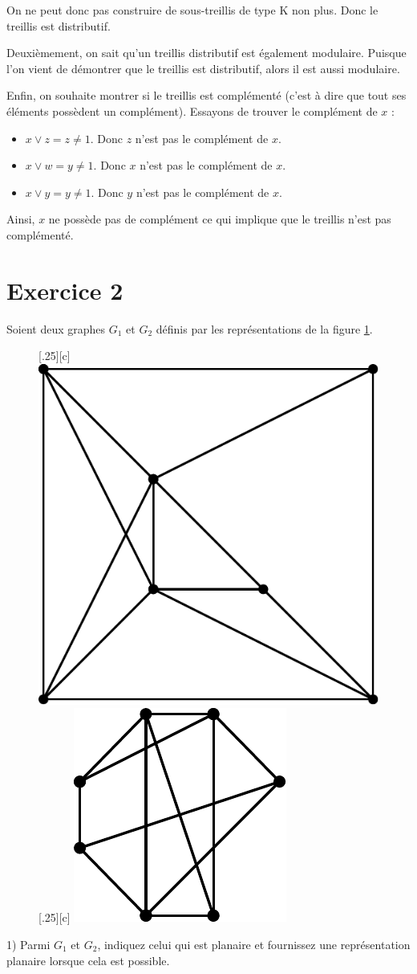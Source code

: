 \documentclass[a4paper,11pt]{article}
\begin{document}
On ne peut donc pas construire de sous-treillis de type K non plus. Donc le treillis est distributif.

Deuxièmement, on sait qu'un treillis distributif est également modulaire. Puisque l'on vient de démontrer que le treillis est distributif, alors il est aussi modulaire.

Enfin, on souhaite montrer si le treillis est complémenté (c'est à dire que tout ses éléments possèdent un complément). Essayons de trouver le complément de $x$ :
\begin{itemize}
	\item $x \vee z = z \neq 1$. Donc $z$ n'est pas le complément de $x$.
	\item $x \vee w = y \neq 1$. Donc $x$ n'est pas le complément de $x$.
	\item $x \vee y = y \neq 1$. Donc $y$ n'est pas le complément de $x$.
\end{itemize}

Ainsi, $x$ ne possède pas de complément ce qui implique que le treillis n'est pas complémenté.

\section*{Exercice 2}

Soient deux graphes $G_1$ et $G_2$ définis par les représentations de la figure \ref{fig:graphs_exo4}.

\begin{figure}[!ht]
	\centering
	[.25\linewidth][c]{
		\includegraphics[width=.2\linewidth]{./graphe1.pdf}
	}
	\hspace{2cm}
	[.25\linewidth][c]{
		\includegraphics[width=.2\linewidth]{./graphe2.pdf}
	}
	\caption{}
	\label{fig:graphs_exo4}
\end{figure}

1) Parmi $G_1$ et $G_2$, indiquez celui qui est planaire et fournissez une représentation planaire lorsque cela est possible.
\end{document}
